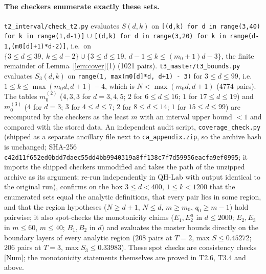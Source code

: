 \documentclass[11pt]{article}
\theoremstyle{definition}
\theoremstyle{remark}
\begin{document}
\paragraph{The checkers enumerate exactly these sets.} \nolinkurl{t2_interval/check_t2.py} evaluates $S(d,k)$ on
\texttt{[(d,k) for d in range(3,40) for k in range(1,d-1)]} $\cup$ \texttt{[(d,k) for d in range(3,20) for k in range(d-1,(m0[d]+1)*d-2)]},
i.e.\ on $\{3\le d\le39,\ k\le d-2\}\cup\{3\le d\le19,\ d-1\le k\le(m_0+1)d-3\}$, the finite remainder of Lemma~\ref{lem:cover}(1) (1021 pairs).
\nolinkurl{t3_master/t3_bounds.py} evaluates $S_3(d,k)$ on \texttt{range(1, max(m0[d]*d, d+1) - 3)} for $3\le d\le99$, i.e.\ $1\le k\le\max(m_0d,d+1)-4$,
which is $N<\max(m_0d,d+1)$ (4774 pairs). The tables $m_0^{(2)}$ ($4,3,3$ for $d=3,4,5$; $2$ for $6\le d\le16$; $1$ for $17\le d\le19$) and
$m_0^{(3)}$ ($4$ for $d=3$; $3$ for $4\le d\le7$; $2$ for $8\le d\le14$; $1$ for $15\le d\le99$) are recomputed by the checkers as the least $m$
with an interval upper bound $<1$ and compared with the stored data. An independent audit script, \nolinkurl{coverage_check.py} (shipped as a separate ancillary file next to \texttt{ca\_appendix.zip}, so the
archive hash is unchanged; SHA-256 \texttt{c42d11f652ed0bdd7daec55dd4bb9940319a8ff138c7f7d59956eacfa9ef0995}; it imports the shipped
checkers unmodified and takes the path of the unzipped archive as its argument; re-run independently in QH-Lab with output identical to the
original run), confirms on the box $3\le d<400$, $1\le k<1200$ that the enumerated sets equal the analytic definitions, that every pair lies
in some region, and that the region hypotheses ($N\ge d+1$, $N\le d$, $m\ge m_0$, $q_0\ge m-1$) hold pairwise; it also spot-checks the
monotonicity claims ($E_1,E_2^u$ in $d\le2000$; $E_2,E_3$ in $m\le60$, $m\le40$; $B_1,B_2$ in $d$) and evaluates the master bounds directly on
the boundary layers of every analytic region ($208$ pairs at $T=2$, max $S\le0.45272$; $206$ pairs at $T=3$, max $S_3\le0.33983$). These spot checks are
consistency checks [Num]; the monotonicity statements themselves are proved in T2.6, T3.4 and above.
\end{document}

